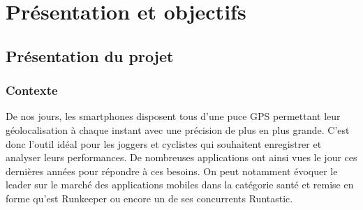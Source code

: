 \part{Présentation et objectifs}
\chapter{Présentation du projet}
\section{Contexte}
De nos jours, les smartphones disposent tous d'une puce GPS permettant leur géolocalisation à chaque instant avec une précision de plus en plus grande. C'est donc l'outil idéal pour les joggers et cyclistes qui souhaitent enregistrer et analyser leurs performances. De nombreuses applications ont ainsi vues le jour ces dernières années pour répondre à ces besoins. On peut notamment évoquer le leader sur le marché des applications mobiles dans la catégorie santé et remise en forme qu'est Runkeeper ou encore un de ses concurrents Runtastic.
